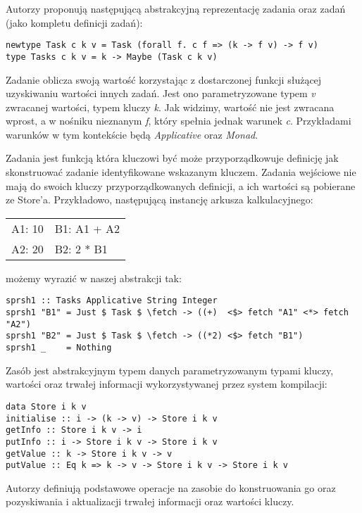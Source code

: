\lstset{style=haskell-style}

Autorzy proponują następującą abstrakcyjną reprezentację zadania oraz zadań (jako kompletu definicji zadań):

\begin{lstlisting}
newtype Task c k v = Task (forall f. c f => (k -> f v) -> f v)
type Tasks c k v = k -> Maybe (Task c k v)
\end{lstlisting}

Zadanie oblicza swoją wartość korzystając z dostarczonej funkcji służącej uzyskiwaniu wartości innych zadań. Jest ono parametryzowane typem \textit{v} zwracanej wartości, typem kluczy \textit{k}. Jak widzimy, wartość nie jest zwracana wprost, a w nośniku nieznanym \textit{f}, który spełnia jednak warunek \textit{c}. Przykładami warunków w tym kontekście będą \textit{Applicative} oraz \textit{Monad}.

Zadania jest funkcją która kluczowi być może przyporządkowuje definicję jak skonstruować zadanie identyfikowane wskazanym kluczem. Zadania wejściowe nie mają do swoich kluczy przyporządkowanych definicji, a ich wartości są pobierane ze Store'a. Przykładowo, następującą instancję arkusza kalkulacyjnego:

\begin{tabular}{ l l }
  A1: 10 & B1: A1 + A2 \\
  A2: 20 & B2: 2 * B1
\end{tabular}

możemy wyrazić w naszej abstrakcji tak:

\begin{lstlisting}
sprsh1 :: Tasks Applicative String Integer
sprsh1 "B1" = Just $ Task $ \fetch -> ((+)  <$> fetch "A1" <*> fetch "A2")
sprsh1 "B2" = Just $ Task $ \fetch -> ((*2) <$> fetch "B1")
sprsh1 _    = Nothing
\end{lstlisting}

Zasób jest abstrakcyjnym typem danych parametryzowanym typami kluczy, wartości oraz trwałej informacji wykorzystywanej przez system kompilacji:

\begin{lstlisting}
data Store i k v
initialise :: i -> (k -> v) -> Store i k v
getInfo :: Store i k v -> i
putInfo :: i -> Store i k v -> Store i k v
getValue :: k -> Store i k v -> v
putValue :: Eq k => k -> v -> Store i k v -> Store i k v
\end{lstlisting}

Autorzy definiują podstawowe operacje na zasobie do konstruowania go oraz pozyskiwania i aktualizacji trwałej informacji oraz wartości kluczy.

